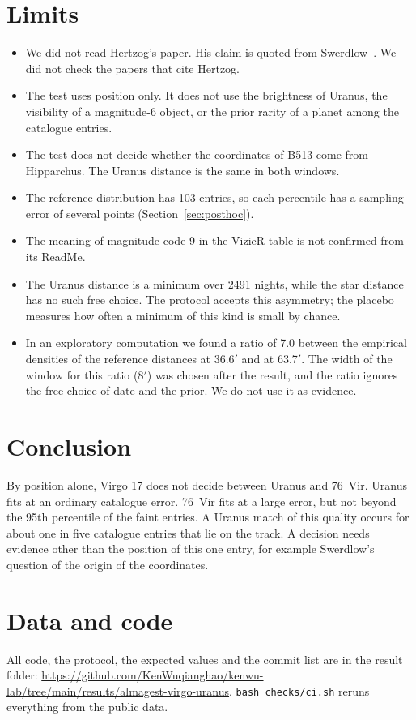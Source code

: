 \documentclass[11pt]{article}
\newcommand{\am}{$'$}
\begin{document}
\section{Limits}
\begin{itemize}
\item We did not read Hertzog's paper. His claim is quoted from Swerdlow~\cite{swerdlow2020}. We did not check the papers that cite Hertzog.
\item The test uses position only. It does not use the brightness of Uranus, the visibility of a magnitude-6 object, or the prior rarity of a planet among the catalogue entries.
\item The test does not decide whether the coordinates of B513 come from Hipparchus. The Uranus distance is the same in both windows.
\item The reference distribution has 103 entries, so each percentile has a sampling error of several points (Section~\ref{sec:posthoc}).
\item The meaning of magnitude code 9 in the VizieR table is not confirmed from its ReadMe.
\item The Uranus distance is a minimum over 2491 nights, while the star distance has no such free choice. The protocol accepts this asymmetry; the placebo measures how often a minimum of this kind is small by chance.
\item In an exploratory computation we found a ratio of 7.0 between the empirical densities of the reference distances at 36.6\am{} and at 63.7\am. The width of the window for this ratio (8\am) was chosen after the result, and the ratio ignores the free choice of date and the prior. We do not use it as evidence.
\end{itemize}

\section{Conclusion}
By position alone, Virgo 17 does not decide between Uranus and 76~Vir. Uranus fits at an ordinary catalogue error. 76~Vir fits at a large error, but not beyond the 95th percentile of the faint entries. A Uranus match of this quality occurs for about one in five catalogue entries that lie on the track. A decision needs evidence other than the position of this one entry, for example Swerdlow's question of the origin of the coordinates.

\section*{Data and code}
All code, the protocol, the expected values and the commit list are in the result folder: \url{https://github.com/KenWuqianghao/kenwu-lab/tree/main/results/almagest-virgo-uranus}. \texttt{bash checks/ci.sh} reruns everything from the public data.
\end{document}

